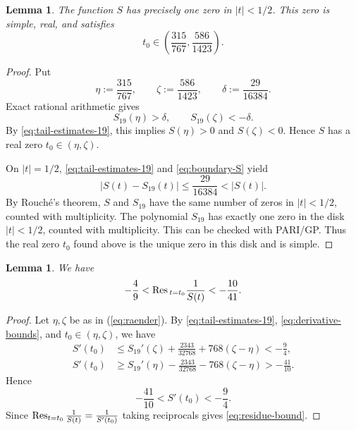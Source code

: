 \documentclass[11pt,reqno]{amsart}
\theoremstyle{plain}
\newtheorem{lemma}[theorem]{Lemma}
\theoremstyle{remark}
\theoremstyle{definition}
\numberwithin{equation}{section}
\def\func#1{\mathop{\rm #1}}%
\newcommand{\links}{\eta }
\newcommand{\naeherung}{\delta }
\newcommand{\rechts}{\zeta }
\begin{document}
\begin{lemma}\label{lem:small-zero}
The function $S$ has precisely one zero in $|t|<1/2$. This zero is simple,
real, and satisfies
\begin{equation}\label{eq:t0-interval}
        t_0\in \left(\frac{315}{767},\frac{586}{1423}\right).
\end{equation}
\end{lemma}

\begin{proof}
Put
\begin{equation}
        \links :=\frac{315}{767},
        \qquad
        \rechts :=\frac{586}{1423},
        \qquad
        \naeherung :=\frac{29}{16384}.
\label{eq:raender}
\end{equation}
Exact rational arithmetic gives
\[
        S_{19}(\links )>\naeherung ,
        \qquad
        S_{19}(\rechts )<-\naeherung .
\]
By \eqref{eq:tail-estimates-19}, this implies $S(\links )>0$ and $S(\rechts )<0$. Hence
$S$ has a real zero $t_0\in(\links ,\rechts )$.

On $|t|=1/2$, \eqref{eq:tail-estimates-19} and \eqref{eq:boundary-S} yield
\[
        |S(t)-S_{19}(t)|\leq \frac{29}{16384}<|S
        (t)|.
\]
By Rouch\'e's theorem, $S$ and $S_{19}$ have
the same number of zeros in $|t|<1/2$, counted with multiplicity. The
polynomial $S_{19}$ has exactly one zero in the disk $|t|<1/2$, counted
with multiplicity. This can be checked with PARI/GP.
Thus the real
zero $t_0$ found above is the unique zero in this disk and is simple.
\end{proof}

\begin{lemma}\label{lem:residue-bound}
We have
\begin{equation}\label{eq:residue-bound}
        -\frac49<\func{Res}{}_{t=t_0}\frac1{S(t)}
        <-\frac{10}{41}.
\end{equation}
\end{lemma}

\begin{proof}
Let $\links ,\rechts $ be as in (\ref{eq:raender}). By \eqref{eq:tail-estimates-19},
\eqref{eq:derivative-bounds}, and $t_0\in(\links ,\rechts )$, we have
\[
\begin{aligned}
S'(t_0)
&\leq S_{19}'(\rechts )+\frac{2343}{32768}+768(\rechts -\links )<-\frac94,\\
S'(t_0)
&\geq S_{19}'(\links )-\frac{2343}{32768}-768(\rechts -\links )>-\frac{41}{10}.
\end{aligned}
\]
Hence
\[
        -\frac{41}{10}<S'(t_0)<-\frac94.
\]
Since $\func{Res}_{t=t_0}\frac1{S(t)}=\frac1{S'(t_0)}$
taking reciprocals
gives \eqref{eq:residue-bound}.
\end{proof}
\end{document}
